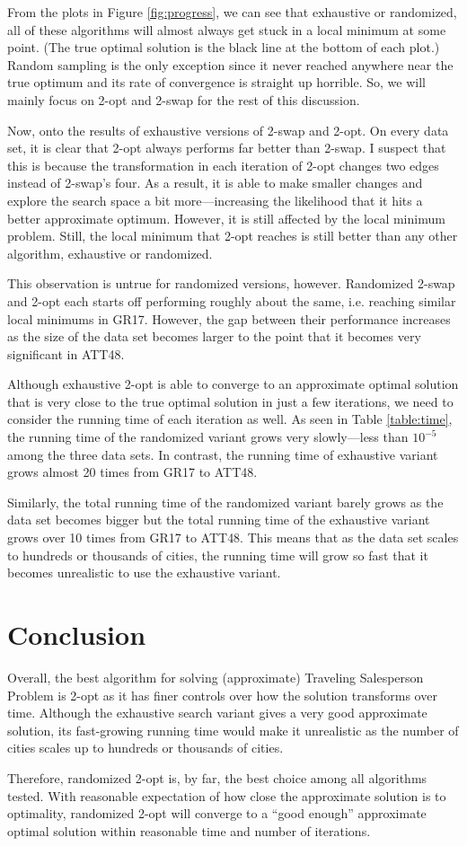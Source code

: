 \documentclass{article}
\begin{document}
From the plots in Figure \ref{fig:progress}, we can see that exhaustive or randomized, all of these algorithms will almost always get stuck in a local minimum at some point. (The true optimal solution is the black line at the bottom of each plot.) Random sampling is the only exception since it never reached anywhere near the true optimum and its rate of convergence is straight up horrible. So, we will mainly focus on 2-opt and 2-swap for the rest of this discussion.

Now, onto the results of exhaustive versions of 2-swap and 2-opt. On every data set, it is clear that 2-opt always performs far better than 2-swap. I suspect that this is because the transformation in each iteration of 2-opt changes two edges instead of 2-swap's four. As a result, it is able to make smaller changes and explore the search space a bit more---increasing the likelihood that it hits a better approximate optimum. However, it is still affected by the local minimum problem. Still, the local minimum that 2-opt reaches is still better than any other algorithm, exhaustive or randomized.

This observation is untrue for randomized versions, however. Randomized 2-swap and 2-opt each starts off performing roughly about the same, i.e. reaching similar local minimums in GR17. However, the gap between their performance increases as the size of the data set becomes larger to the point that it becomes very significant in ATT48.

Although exhaustive 2-opt is able to converge to an approximate optimal solution that is very close to the true optimal solution in just a few iterations, we need to consider the running time of each iteration as well. As seen in Table \ref{table:time}, the running time of the randomized variant grows very slowly---less than \(10^{-5}\) among the three data sets. In contrast, the running time of exhaustive variant grows almost 20 times from GR17 to ATT48. 

Similarly, the total running time of the randomized variant barely grows as the data set becomes bigger but the total running time of the exhaustive variant grows over 10 times from GR17 to ATT48. This means that as the data set scales to hundreds or thousands of cities, the running time will grow so fast that it becomes unrealistic to use the exhaustive variant.

\section{Conclusion}

Overall, the best algorithm for solving (approximate) Traveling Salesperson Problem is 2-opt as it has finer controls over how the solution transforms over time. Although the exhaustive search variant gives a very good approximate solution, its fast-growing running time would make it unrealistic as the number of cities scales up to hundreds or thousands of cities. 

Therefore, randomized 2-opt is, by far, the best choice among all algorithms tested. With reasonable expectation of how close the approximate solution is to optimality, randomized 2-opt will converge to a ``good enough'' approximate optimal solution within reasonable time and number of iterations.
\end{document}
